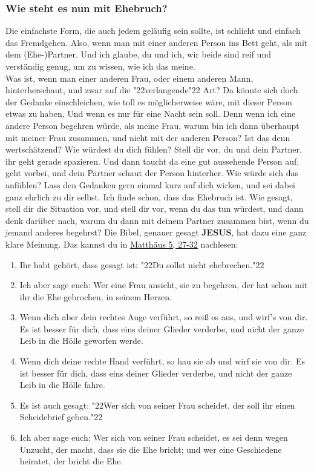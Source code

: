 \documentclass[12pt,a5paper]{article}
\newcommand{\Jesus}[0]{\textbf{JESUS}}
\newcommand{\q}[1]{\char"22{#1}\char"22 }
\begin{document}
	\subsubsection{Wie steht es nun mit Ehebruch?}
		Die einfachste Form,
		die auch jedem gel\"aufig sein sollte,
		ist schlicht und einfach das Fremdgehen.
		Also,
		wenn man mit einer anderen Person ins Bett geht,
		als mit dem (Ehe-)Partner.
		Und ich glaube,
		du und ich,
		wir beide sind reif und verst\"andig genug,
		um zu wissen,
		wie ich das meine.
		\\
		Was ist,
		wenn man einer anderen Frau,
		oder einem anderen Mann,
		hinterherschaut,
		und zwar auf die \q{verlangende} Art?
		Da k\"onnte sich doch der Gedanke einschleichen,
		wie toll es m\"oglicherweise w\"are,
		mit dieser Person etwas zu haben.
		Und wenn es nur f\"ur eine Nacht sein soll.
		Denn wenn ich eine andere Person begehren w\"urde,
		als meine Frau,
		warum bin ich dann \"uberhaupt mit meiner Frau zusammen,
		und nicht mit der anderen Person?
		Ist das denn wertsch\"atzend?
		Wie w\"urdest du dich f\"uhlen?
		Stell dir vor,
		du und dein Partner,
		ihr geht gerade spazieren.
		Und dann taucht da eine gut aussehende Person auf,
		geht vorbei,
		und dein Partner schaut der Person hinterher.
		Wie w\"urde sich das anf\"uhlen?
		Lass den Gedanken gern einmal kurz auf dich wirken,
		und sei dabei ganz ehrlich zu dir selbst.
		Ich finde schon,
		dass das Ehebruch ist.
		Wie gesagt,
		stell dir die Situation vor,
		und stell dir vor,
		wenn du das tun w\"urdest,
		und dann denk dar\"uber nach,
		warum du dann mit deinem Partner zusammen bist,
		wenn du jemand anderes begehrst?
		Die Bibel,
		genauer gesagt {\Jesus},
		hat dazu eine ganz klare Meinung.
		Das kannst du in \href{https://www.die-bibel.de/bibeln/online-bibeln/lesen/LU17/MAT.5/Matthäus-5}{Matth\"aus 5, 27-32} nachlesen:
		\begin{enumerate}[noitemsep,start=27]
			\item	Ihr habt geh\"ort,
					dass gesagt ist:
					\q{Du sollst nicht ehebrechen.}
			\item	Ich aber sage euch:
					Wer eine Frau ansieht,
					sie zu begehren,
					der hat schon mit ihr die Ehe gebrochen,
					in seinem Herzen.
			\item	Wenn dich aber dein rechtes Auge verf\"uhrt,
					so rei{\ss} es aus,
					und wirf's von dir.
					Es ist besser f\"ur dich,
					dass eins deiner Glieder verderbe,
					und nicht der ganze Leib in die H\"olle geworfen werde.
			\item	Wenn dich deine rechte Hand verf\"uhrt,
					so hau sie ab und wirf sie von dir.
					Es ist besser für dich,
					dass eins deiner Glieder verderbe,
					und nicht der ganze Leib in die H\"olle fahre.
			\item	Es ist auch gesagt:
					\q{Wer sich von seiner Frau scheidet,
					der soll ihr einen Scheidebrief geben.}
			\item	Ich aber sage euch:
					Wer sich von seiner Frau scheidet,
					es sei denn wegen Unzucht,
					der macht,
					dass sie die Ehe bricht;
					und wer eine Geschiedene heiratet,
					der bricht die Ehe.
		\end{enumerate}
	
\end{document}
